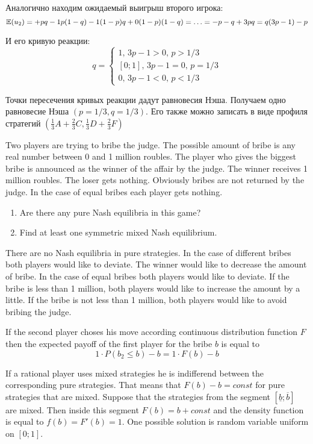 \begin{problem}
\begin{sol}
Аналогично находим ожидаемый выигрыш второго игрока:
\[
\mathbb{E}(u_2)=+pq-1p(1-q)-1(1-p)q+0(1-p)(1-q)=\ldots=-p-q+3pq=q(3p-1)-p
\]

И его кривую реакции:
\[
q=
\begin{cases}
1, \, 3p-1>0, \, p>1/3 \\
[0;1], \, 3p-1=0, \, p=1/3 \\
0, \, 3p-1<0, \, p<1/3
\end{cases}
\]

Точки пересечения кривых реакции дадут равновесия Нэша. Получаем одно равновесие Нэша $(p=1/3,q=1/3)$. Его также можно записать в виде профиля стратегий $(\frac{1}{3}A+\frac{2}{3}C,\frac{1}{3}D+\frac{2}{3}F)$


\end{sol}
\end{problem}

\begin{problem}
Two players are trying to bribe the judge. The possible amount of bribe is any real number between 0 and 1 million roubles. The player who gives the biggest bribe is announced as the winner of the affair by the judge. The winner receives 1 million roubles. The loser gets nothing. Obviously bribes are not returned by the judge. In the case of equal bribes each player gets nothing.
\begin{enumerate}
\item Are there any pure Nash equilibria in this game?
\item Find at least one symmetric mixed Nash equilibrium.
\end{enumerate}


\begin{sol}

There are no Nash equilibria in pure strategies. In the case of different bribes both players would like to deviate. The winner would like to decrease the amount of bribe.  In the case of equal bribes both players would like to deviate. If the bribe is less than 1 million, both players would like to increase the amount by a little. If the bribe is not less than 1 million, both players would like to avoid bribing the judge.


If the second player choses his move according continuous distribution function $F$ then the expected payoff of the first player for the bribe $b$ is equal to
\[
1\cdot P(b_2 \leq b) - b = 1\cdot F(b)-b
\]

If a rational player uses mixed strategies he is indifferend between the corresponding pure strategies. That means that $F(b)-b=const$ for pure strategies that are mixed. Suppose that the strategies from the segment $[\underline{b};\overline{b}]$ are mixed. Then inside this segment $F(b)=b+const$ and the density function is equal to $f(b)=F'(b)=1$. One possible solution is random variable uniform on $[0;1]$.
\end{sol}
\end{problem}

